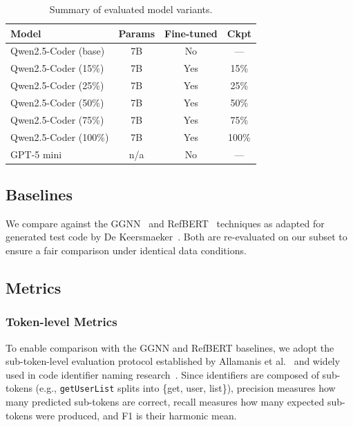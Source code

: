 \documentclass[conference]{IEEEtran}
\begin{document}
\begin{table}[t]
  \centering
  \caption{Summary of evaluated model variants.}
  \label{tab:models}
  \begin{tabular}{lccc}
    \toprule
    \textbf{Model} & \textbf{Params} & \textbf{Fine-tuned} & \textbf{Ckpt} \\
    \midrule
    Qwen2.5-Coder (base) & 7B  & No  & --- \\
    Qwen2.5-Coder (15\%) & 7B  & Yes & 15\% \\
    Qwen2.5-Coder (25\%) & 7B  & Yes & 25\% \\
    Qwen2.5-Coder (50\%) & 7B  & Yes & 50\% \\
    Qwen2.5-Coder (75\%) & 7B  & Yes & 75\% \\
    Qwen2.5-Coder (100\%)& 7B  & Yes & 100\% \\
    GPT-5 mini           & n/a & No  & --- \\
    \bottomrule
  \end{tabular}
\end{table}

\subsection{Baselines}

We compare against the GGNN~\cite{allamanis2018learning} and
RefBERT~\cite{liu2023refbert} techniques as adapted for generated test code by
De Keersmaeker~\cite{dekeersmaeker2024enhancing}.
Both are re-evaluated on our subset to ensure a fair comparison under identical
data conditions.

\subsection{Metrics}

\subsubsection{Token-level Metrics}

To enable comparison with the GGNN and RefBERT baselines, we adopt the
sub-token-level evaluation protocol established by Allamanis et
al.~\cite{allamanis2018learning} and widely used in code identifier naming
research~\cite{alon2019code2seq,liu2023refbert}.
Since identifiers are composed of sub-tokens (e.g., \texttt{getUserList} splits
into \{get, user, list\}), precision measures how many predicted sub-tokens are
correct, recall measures how many expected sub-tokens were produced, and F1 is
their harmonic mean.
\end{document}
